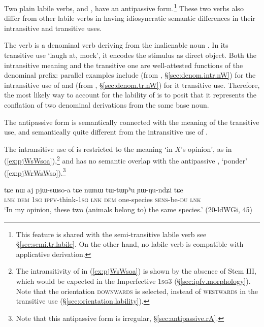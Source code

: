 Two plain labile verbs,   and  , have an antipassive form.\footnote{This feature is shared with the semi-transitive labile verb  see §\ref{sec:semi.tr.labile}. On the other hand, no labile verb is compatible with applicative derivation. } These two verbs also differ from other labile verbs in having idiosyncratic semantic differences in their intransitive and transitive uses. 


The verb  is a denominal verb deriving from the inalienable noun . In its transitive use  `laugh at, mock', it encodes the stimulus as direct object. Both the intransitive meaning and the transitive one are well-attested functions of the  denominal prefix: parallel examples include  (from , §\ref{sec:denom.intr.nW}) for the intransitive use of  and  (from , §\ref{sec:denom.tr.nW}) for it transitive use. Therefore, the most likely way to account for the lability of  is to posit that it represents the conflation of two denominal derivations from the same base noun.

The antipassive form  is semantically connected with the meaning of the transitive use, and semantically quite different from the intransitive use of  .

The intransitive use of  is restricted to the meaning `in $X$'s opinion', as in (\ref{ex:pjWsWsoa}),\footnote{The intransitivity of  in (\ref{ex:pjWsWsoa}) is shown by the absence of Stem III, which would be expected in the Imperfective \textsc{1sg}\fl{}3 (§\ref{sec:ipfv.morphology}). Note that the orientation \textsc{downwards} is selected, instead of \textsc{westwards} in the transitive use (§\ref{sec:orientation.lability}). } and has no semantic overlap with the antipassive , `ponder' (\ref{ex:pjWrWsWso}).\footnote{Note that this antipassive form is irregular, §\ref{sec:antipassive.rA}.}  

\begin{exe}
\ex \label{ex:pjWsWsoa}
\gll  tɕe nɯ aj pjɯ-sɯso-a tɕe nɯnɯ tɯ-tɯpʰu ɲɯ-ŋu-ndʑi tɕe \\
\textsc{lnk} \textsc{dem} \textsc{1sg} \textsc{ipfv}-think-\textsc{1sg} \textsc{lnk} \textsc{dem} one-species \textsc{sens}-be-\textsc{du} \textsc{lnk} \\
\glt  `In my opinion, these two (animals belong to) the same species.' (20-ldWGi, 45)
\end{exe}

